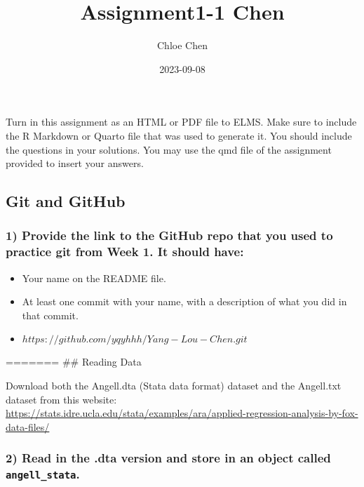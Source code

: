 \documentclass[
  12pt,
]{article}
\title{Assignment1-1 Chen}
\author{Chloe Chen}
\date{2023-09-08}
\begin{document}
\maketitle

Turn in this assignment as an HTML or PDF file to ELMS. Make sure to
include the R Markdown or Quarto file that was used to generate it. You
should include the questions in your solutions. You may use the qmd file
of the assignment provided to insert your answers.

\hypertarget{git-and-github}{%
\subsection{Git and GitHub}\label{git-and-github}}

\hypertarget{provide-the-link-to-the-github-repo-that-you-used-to-practice-git-from-week-1.-it-should-have}{%
\subsubsection{1) Provide the link to the GitHub repo that you used to
practice git from Week 1. It should
have:}\label{provide-the-link-to-the-github-repo-that-you-used-to-practice-git-from-week-1.-it-should-have}}

\begin{itemize}
\item
  Your name on the README file.
\item
  At least one commit with your name, with a description of what you did
  in that commit.
\item
  \(https://github.com/yqyhhh/Yang-Lou-Chen.git\)
\end{itemize}

======= \#\# Reading Data

Download both the Angell.dta (Stata data format) dataset and the
Angell.txt dataset from this website:
\url{https://stats.idre.ucla.edu/stata/examples/ara/applied-regression-analysis-by-fox-data-files/}

\hypertarget{read-in-the-.dta-version-and-store-in-an-object-called-angell_stata.}{%
\subsubsection{\texorpdfstring{2) Read in the .dta version and store in
an object called
\texttt{angell\_stata}.}{2) Read in the .dta version and store in an object called angell\_stata.}}\label{read-in-the-.dta-version-and-store-in-an-object-called-angell_stata.}}
\end{document}
